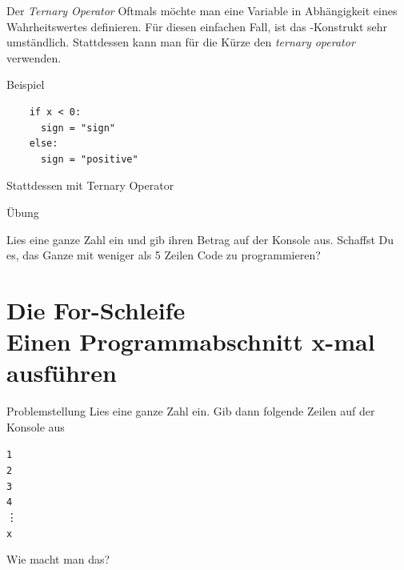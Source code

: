 \begin{fragile}{}
\begin{block}{Der \emph{Ternary Operator}}
\vspace{2pt}
Oftmals möchte man eine Variable in Abhängigkeit eines Wahrheitswertes definieren. Für diesen einfachen Fall, ist das -Konstrukt sehr umständlich. Stattdessen kann man für die Kürze den \emph{ternary operator} verwenden. 
\end{block}
\vspace{12pt}
\pause
\begin{exampleblock}{Beispiel}
	\vspace{2pt}
	\begin{verbatim}
	if x < 0: 
	  sign = "sign"	
	else: 
	  sign = "positive"
	\end{verbatim}
\end{exampleblock}
\pause 
\begin{block}{Stattdessen mit Ternary Operator}
	\vspace{2pt}
\end{block}
\end{fragile}

\begin{frame}{Übung}

\begin{block}{}
	\vspace{2pt}
Lies eine ganze Zahl ein und gib ihren Betrag auf der Konsole aus. Schaffst Du es, das Ganze mit weniger als 5 Zeilen Code zu programmieren? 
\end{block}

\end{frame}

\section{Die For-Schleife \\ \footnotesize Einen Programmabschnitt x-mal ausführen}

\begin{frame}

\begin{block}{Problemstellung}
\vspace{2pt}
Lies eine ganze Zahl  ein. Gib dann folgende Zeilen auf der Konsole aus 

\texttt{1}\\
\texttt{2}\\
\texttt{3}\\
\texttt{4}\\
\vdots \\
\texttt{x}

\vspace{12pt}
Wie macht man das? 

\end{block}
\end{frame}

